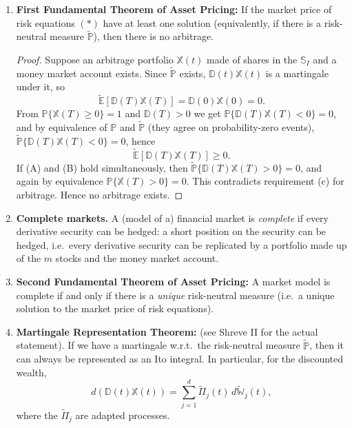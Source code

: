 \begin{enumerate}
    \item \textbf{First Fundamental Theorem of Asset Pricing:} If the market price of risk equations $(\ast)$ have at least one solution (equivalently, if there is a risk-neutral measure $\tilde{\mathbb{P}}$), then there is no arbitrage.
    \begin{proof}
        Suppose an arbitrage portfolio $\mathbb{X}(t)$ made of shares in the $\mathbb{S}_I$ and a money market account exists. Since $\tilde{\mathbb{P}}$ exists, $\mathbb{D}(t)\mathbb{X}(t)$ is a martingale under it, so
        \[\tilde{\mathbb{E}}[\mathbb{D}(T)\mathbb{X}(T)] = \mathbb{D}(0)\mathbb{X}(0) = 0. \tag{A}\]
        From $\mathbb{P}\{\mathbb{X}(T) \geq 0\} = 1$ and $\mathbb{D}(T) > 0$ we get $\mathbb{P}\{\mathbb{D}(T)\mathbb{X}(T) < 0\} = 0$, and by equivalence of $\mathbb{P}$ and $\tilde{\mathbb{P}}$ (they agree on probability-zero events), $\tilde{\mathbb{P}}\{\mathbb{D}(T)\mathbb{X}(T) < 0\} = 0$, hence
        \[\tilde{\mathbb{E}}[\mathbb{D}(T)\mathbb{X}(T)] \geq 0. \tag{B}\]
        If (A) and (B) hold simultaneously, then $\tilde{\mathbb{P}}\{\mathbb{D}(T)\mathbb{X}(T) > 0\} = 0$, and again by equivalence $\mathbb{P}\{\mathbb{X}(T) > 0\} = 0$. This contradicts requirement (c) for arbitrage. Hence no arbitrage exists.
    \end{proof}

    \item \textbf{Complete markets.} A (model of a) financial market is \textit{complete} if every derivative security can be hedged: a short position on the security can be hedged, i.e.\ every derivative security can be replicated by a portfolio made up of the $m$ stocks and the money market account.

    \item \textbf{Second Fundamental Theorem of Asset Pricing:} A market model is complete if and only if there is a \textit{unique} risk-neutral measure (i.e.\ a unique solution to the market price of risk equations).

    \item \textbf{Martingale Representation Theorem:} (see Shreve II for the actual statement). If we have a martingale w.r.t.\ the risk-neutral measure $\tilde{\mathbb{P}}$, then it can always be represented as an Ito integral. In particular, for the discounted wealth,
    \[d(\mathbb{D}(t)\mathbb{X}(t)) = \sum_{j=1}^{d}\tilde{\Pi}_j(t)\, d\tilde{\mathbb{W}}_j(t),\]
    where the $\tilde{\Pi}_j$ are adapted processes.


\end{enumerate}
